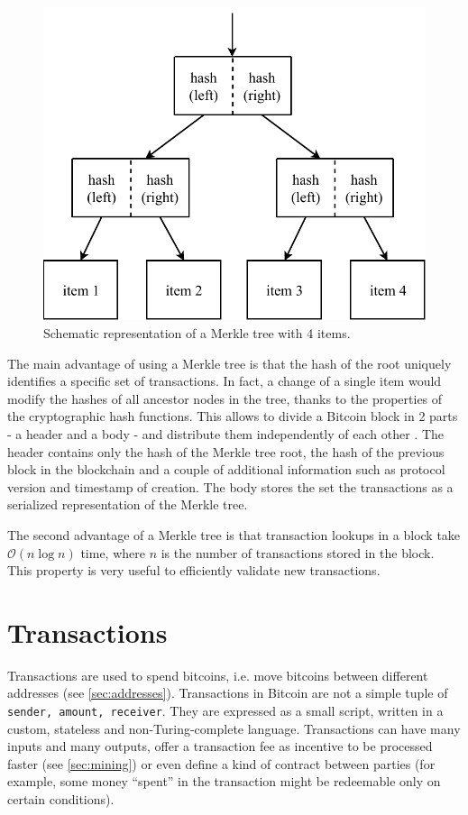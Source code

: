 \begin{figure}[h]
	\centering
	\vspace*{0.1cm}
	\includegraphics[scale=0.7]{figures/merkle}
	\vspace*{0.25cm}
	\caption{Schematic representation of a Merkle tree with \num{4} items.}
	\label{fig:merkle}
\end{figure}

The main advantage of using a Merkle tree is that the hash of the root uniquely identifies a specific set of transactions.
In fact, a change of a single item would modify the hashes of all ancestor nodes in the tree, thanks to the properties of the cryptographic hash functions.
This allows to divide a Bitcoin block in \num{2} parts - a header and a body - and distribute them independently of each other \cite{bitcoin_reference}.
The header contains only the hash of the Merkle tree root, the hash of the previous block in the blockchain and a couple of additional information such as protocol version and timestamp of creation.
The body stores the set the transactions as a serialized representation of the Merkle tree.

The second advantage of a Merkle tree is that transaction lookups in a block take $\mathcal{O}(n\log n)$ time, where $n$ is the number of transactions stored in the block.
This property is very useful to efficiently validate new transactions.

\section{Transactions}
Transactions are used to spend bitcoins, i.e. move bitcoins between different addresses (see \cref{sec:addresses}).
Transactions in Bitcoin are not a simple tuple of \texttt{\textlangle sender, amount, receiver\textrangle}.
They are expressed as a small script, written in a custom, stateless and non-Turing-complete language.
Transactions can have many inputs and many outputs, offer a transaction fee as incentive to be processed faster (see \cref{sec:mining}) or even define a kind of contract between parties (for example, some money ``spent'' in the transaction might be redeemable only on certain conditions).

